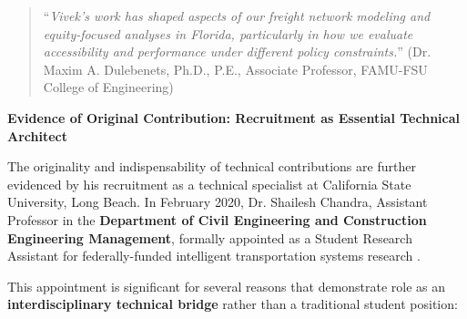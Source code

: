 \begin{quote}
``\textit{Vivek's work has shaped aspects of our freight network modeling and equity-focused analyses in Florida, particularly in how we evaluate accessibility and performance under different policy constraints.}'' (Dr. Maxim A. Dulebenets, Ph.D., P.E., Associate Professor, FAMU-FSU College of Engineering) \cite{LOR3}
\end{quote}

\textbf{Evidence of Original Contribution: Recruitment as Essential Technical Architect}

The originality and indispensability of \drs technical contributions are further evidenced by his recruitment as a technical specialist at California State University, Long Beach. In February 2020, Dr. Shailesh Chandra, Assistant Professor in the \textbf{Department of Civil Engineering and Construction Engineering Management}, formally appointed \dr as a Student Research Assistant for federally-funded intelligent transportation systems research \cite{OR1B}.

This appointment is significant for several reasons that demonstrate \drs role as an \textbf{interdisciplinary technical bridge} rather than a traditional student position:


